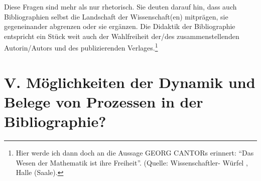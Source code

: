 \documentclass[a4paper,
fontsize=11pt,
oneside,
numbers=noperiodatend,
parskip=half-,
bibliography=totoc,
final
]{scrartcl}
\begin{document}
Diese Fragen sind mehr als nur rhetorisch. Sie deuten darauf hin, dass
auch Bibliographien selbst die Landschaft der Wissenschaft(en)
mitprägen, sie gegeneinander abgrenzen oder sie ergänzen. Die Didaktik
der Bibliographie entspricht ein Stück weit auch der Wahlfreiheit
der/des zusammenstellenden Autorin/Autors und des publizierenden
Verlages.\footnote{Hier werde ich dann doch an die Aussage GEORG CANTORs
  erinnert: \enquote{Das Wesen der Mathematik ist ihre Freiheit}.
  (Quelle: Wissenschaftler- Würfel , Halle (Saale).}

\section*{V. Möglichkeiten der Dynamik und Belege von Prozessen in
der
Bibliographie?}\label{v.-muxf6glichkeiten-der-dynamik-und-belege-von-prozessen-in-der-bibliographie}
\end{document}
